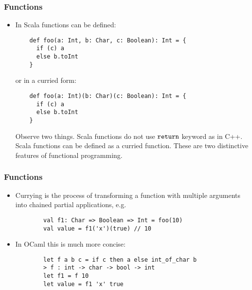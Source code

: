 \documentclass[handout]{beamer}
\begin{document}
\begin{frame}[fragile]
  \frametitle{Functions}
  \begin{itemize}
  \item In Scala functions can be defined:
    \begin{verbatim}
    def foo(a: Int, b: Char, c: Boolean): Int = {
      if (c) a
      else b.toInt
    }
    \end{verbatim}
    or in a curried form:
    \begin{verbatim}
    def foo(a: Int)(b: Char)(c: Boolean): Int = {
      if (c) a
      else b.toInt
    }
    \end{verbatim}
    Observe two things. Scala functions do not use $\verb|return|$ keyword as in C++. Scala functions can be defined as a curried function. These are two distinctive features of functional programming.
  \end{itemize}
\end{frame}

\begin{frame}[fragile]
  \frametitle{Functions}
  \begin{itemize}
      \item Currying is the process of transforming a function with multiple arguments into chained partial applications, e.g.
      \begin{verbatim}
        val f1: Char => Boolean => Int = foo(10)
        val value = f1('x')(true) // 10
      \end{verbatim}
      \item In OCaml this is much more concise:
        \begin{verbatim}
        let f a b c = if c then a else int_of_char b
        > f : int -> char -> bool -> int
        let f1 = f 10
        let value = f1 'x' true
        \end{verbatim}
  \end{itemize}
\end{frame}
\end{document}
